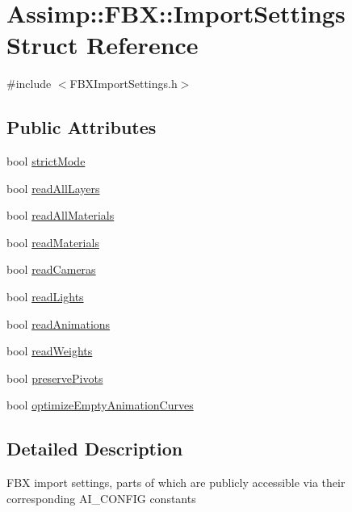 \hypertarget{struct_assimp_1_1_f_b_x_1_1_import_settings}{\section{Assimp\+:\+:F\+B\+X\+:\+:Import\+Settings Struct Reference}
\label{struct_assimp_1_1_f_b_x_1_1_import_settings}
}


{\ttfamily \#include $<$F\+B\+X\+Import\+Settings.\+h$>$}

\subsection*{Public Attributes}
\begin{DoxyCompactItemize}
\item 
bool \hyperlink{struct_assimp_1_1_f_b_x_1_1_import_settings_ab1f3b328a3c6ee3b6a95246d3c766121}{strict\+Mode}
\item 
bool \hyperlink{struct_assimp_1_1_f_b_x_1_1_import_settings_a6f055a1367e73469ee9e67d704d782a9}{read\+All\+Layers}
\item 
bool \hyperlink{struct_assimp_1_1_f_b_x_1_1_import_settings_a5227612d4238915b0a40dc9fa0369023}{read\+All\+Materials}
\item 
bool \hyperlink{struct_assimp_1_1_f_b_x_1_1_import_settings_a49a15745389fdc255551ab3a0b02ad8d}{read\+Materials}
\item 
bool \hyperlink{struct_assimp_1_1_f_b_x_1_1_import_settings_a79feafd0be973cb9b0023febe4ee3b7b}{read\+Cameras}
\item 
bool \hyperlink{struct_assimp_1_1_f_b_x_1_1_import_settings_a0cb7d2b9a85eca0d39fff7da3e347def}{read\+Lights}
\item 
bool \hyperlink{struct_assimp_1_1_f_b_x_1_1_import_settings_a15c91e04f6849f8305df96bdfd8f2ae8}{read\+Animations}
\item 
bool \hyperlink{struct_assimp_1_1_f_b_x_1_1_import_settings_a6de6932ff149210d35446f325c3e3993}{read\+Weights}
\item 
bool \hyperlink{struct_assimp_1_1_f_b_x_1_1_import_settings_a431d64cc7cc705d0452cae146f5303d8}{preserve\+Pivots}
\item 
bool \hyperlink{struct_assimp_1_1_f_b_x_1_1_import_settings_ab4bf64aebd5facf693803876953c7bc0}{optimize\+Empty\+Animation\+Curves}
\end{DoxyCompactItemize}


\subsection{Detailed Description}
F\+B\+X import settings, parts of which are publicly accessible via their corresponding A\+I\+\_\+\+C\+O\+N\+F\+I\+G constants 

